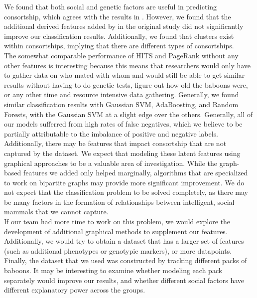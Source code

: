 \documentclass[twoside,twocolumn,paper=letter,fontsize=11pt]{article}
\begin{document}
We found that both social and genetic factors are useful in predicting
consortship, which agrees with the results in \cite{Tung:2012}. However, we
found that the additional derived features added by in the original study did
not significantly improve our classification results. Additionally, we found
that clusters exist within consortships, implying that there are different types
of consortships.\\
The somewhat comparable performance of HITS and PageRank without any other features is interesting because this means that researchers would only have to gather data on who mated with whom and would still be able to get similar results without having to do genetic tests, figure out how old the baboons were, or any other time and resource intensive data gathering. 
Generally, we found similar classification results with Gaussian SVM,
AdaBoosting, and Random Forests, with the Gaussian SVM at a slight edge over the
others. Generally, all of our models sufferred from high rates of false
negatives, which we believe to be partially attributable to the imbalance of
positive and negative labels. Additionally, there may be features that impact
consortship that are not captured by the dataset. We expect that modeling these
latent features using graphical approaches to be a valuable area of
investigation. While the graph-based features we added only helped marginally,
algorithms that are specialized to work on bipartite graphs may provide more
significant improvement. We do not expect that the classification problem to be
solved completely, as there may be many factors in the formation of
relationships between intelligent, social mammals that we cannot capture.
\\

If our team had more time to work on this problem, we would explore the
development of additional graphical methods to supplement our features.
Additionally, we would try to obtain a dataset that has a larger set of features
(such as additional phenotypes or genotypic markers), or more datapoints.
Finally, the dataset that we used was constructed by tracking different packs of
baboons. It may be interesting to examine whether modeling each pack separately
would improve our results, and whether different social factors have different
explanatory power across the groups.
\\

\end{document}
